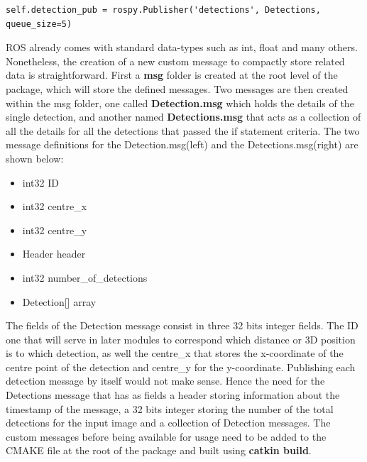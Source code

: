 \begin{lstlisting}
self.detection_pub = rospy.Publisher('detections', Detections, queue_size=5)
\end{lstlisting}

ROS already comes with standard data-types such as int, float and many others. Nonetheless, the creation of a new custom message to compactly store related data is straightforward. First a \textbf{msg} folder is created at the root level of the package, which will store the defined messages. Two messages are then created within the msg folder, one called \textbf{Detection.msg} which holds the details of the single detection, and another named \textbf{Detections.msg} that acts as a collection of all the details for all the detections that passed the if statement criteria. The two message definitions for the Detection.msg(left) and the Detections.msg(right) are shown below:

\begin{multicols}{2}
  \begin{itemize}
    \item int32 ID
    \item int32 centre\_x
    \item int32 centre\_y
  \end{itemize}

  \columnbreak

  \begin{itemize}
    \item Header header
    \item int32 number\_of\_detections
    \item Detection[] array
  \end{itemize}
\end{multicols}

The fields of the Detection message consist in three 32 bits integer fields. The ID one that will serve in later modules to correspond which distance or 3D position is to which detection, as well the centre\_x that stores the x-coordinate of the centre point of the detection and centre\_y for the y-coordinate. Publishing each detection message by itself would not make sense. Hence the need for the Detections message that has as fields a header storing information about the timestamp of the message, a 32 bits integer storing the number of the total detections for the input image and a collection of Detection messages. The custom messages before being available for usage need to be added to the CMAKE file at the root of the package and built using \textbf{catkin build}.


